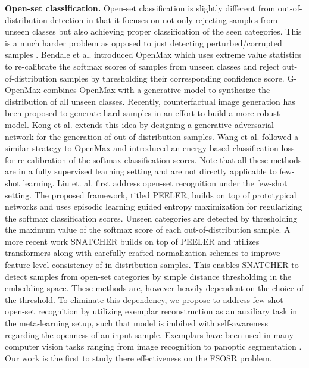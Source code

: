 \noindent \textbf{Open-set classification.} Open-set classification is slightly different from out-of-distribution detection in that it focuses on not only rejecting samples from unseen classes but also achieving proper classification of the seen categories. This is a much harder problem as opposed to just detecting perturbed/corrupted samples \cite{peeler}. Bendale et al. \cite{open_max} introduced OpenMax which uses extreme value statistics to re-calibrate the softmax scores of samples from unseen classes and reject out-of-distribution samples by thresholding their corresponding confidence score. G-OpenMax \cite{Gopenmax} combines OpenMax with a generative model to synthesize the distribution of all unseen classes. Recently, counterfactual image generation \cite{Neal_2018_ECCV} has been proposed to generate hard samples in an effort to build a more robust model. Kong et al. \cite{kong2021opengan} extends this idea by designing a generative adversarial network for the generation of out-of-distribution samples. Wang et al. \cite{wang2021energy} followed a similar strategy to OpenMax \cite{open_max} and introduced an energy-based classification loss for re-calibration of the softmax classification scores. Note that all these methods are in a fully supervised learning setting and are not directly applicable to few-shot learning. Liu et. al. \cite{peeler} first address open-set recognition under the few-shot setting. The proposed framework, titled PEELER, builds on top of prototypical networks \cite{proto_net} and uses episodic learning guided entropy maximization for regularizing the softmax classification scores. Unseen categories are detected by thresholding the maximum value of the softmax score of each out-of-distribution sample.
A more recent work SNATCHER \cite{snatcher} builds on top of PEELER \cite{peeler} and utilizes transformers \cite{vaswani2017attention} along with carefully crafted normalization schemes to improve feature level consistency of in-distribution samples. This enables SNATCHER to detect samples from open-set categories by simple distance thresholding in the embedding space. These methods are, however heavily dependent on the choice of the threshold. To eliminate this dependency, we propose to address few-shot open-set recognition by utilizing exemplar reconstruction as an auxiliary task in the meta-learning setup, such that model is imbibed with self-awareness regarding the openness of an input sample. Exemplars have been used in many computer vision tasks ranging from image recognition \cite{kim2019variational} to panoptic segmentation \cite{hwang2021exemplar}. Our work is the first to study there effectiveness on the FSOSR problem.


